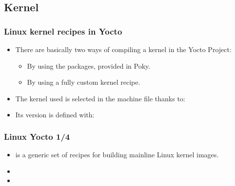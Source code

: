 \subsection{Kernel}

\begin{frame}
  \frametitle{Linux kernel recipes in Yocto}
  \begin{itemize}
    \item There are basically two ways of compiling a kernel in the
      Yocto Project:
      \begin{itemize}
        \item By using the  packages, provided in
          Poky.
        \item By using a fully custom kernel recipe.
      \end{itemize}
    \item The kernel used is selected in the machine file thanks to:
    \item Its version is defined with:
  \end{itemize}
\end{frame}

\begin{frame}
  \frametitle{Linux Yocto 1/4}
  \begin{itemize}
    \item {} is a generic set of recipes for building
      mainline Linux kernel images.
    \item {}
    \item {}
  \end{itemize}
\end{frame}

